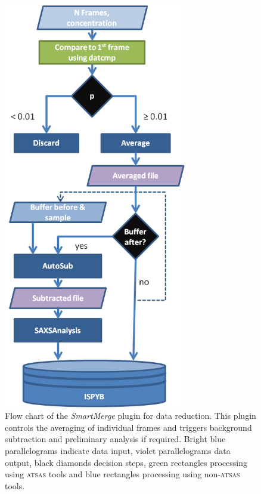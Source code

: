 \documentclass[preprint,pdf]{iucr}              %
\begin{document}
\begin{figure}
\centering
\includegraphics[width=8cm]{smartmerge.png}%
\caption{Flow chart of the \textit{SmartMerge} plugin for data reduction.
This plugin controls the averaging of individual frames and triggers background
subtraction and preliminary analysis if required.
Bright blue parallelograms indicate data input, violet parallelograms data
output, black diamonds decision steps, green rectangles processing using
\textsc{atsas} tools and blue rectangles processing using non-\textsc{atsas} tools. }
\label{fgr:smart}
\end{figure}
\end{document}
